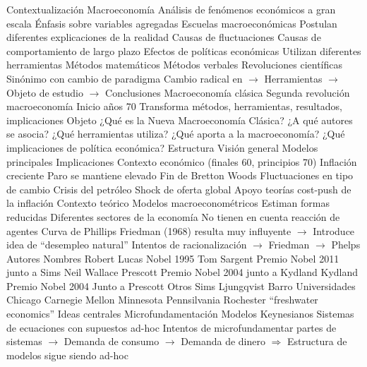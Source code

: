 \documentclass{nuevotema}
\begin{document}
\begin{esquemal}
	\1[] 
		\2 Contextualización
			\3 Macroeconomía
				\4 Análisis de fenómenos económicos a gran escala
				\4 Énfasis sobre variables agregadas
			\3 Escuelas macroeconómicas
				\4 Postulan diferentes explicaciones de la realidad
				\4[] Causas de fluctuaciones
				\4[] Causas de comportamiento de largo plazo
				\4[] Efectos de políticas económicas
				\4 Utilizan diferentes herramientas
				\4[] Métodos matemáticos
				\4[] Métodos verbales
				\4 Revoluciones científicas
				\4[] Sinónimo con cambio de paradigma
				\4[] Cambio radical en
				\4[] $\to$ Herramientas
				\4[] $\to$ Objeto de estudio
				\4[] $\to$ Conclusiones
			\3 Macroeconomía clásica
				\4 Segunda revolución macroeconomía
				\4 Inicio años 70
				\4 Transforma métodos, herramientas, resultados, implicaciones
		\2 Objeto
			\3 ¿Qué es la Nueva Macroeconomía Clásica?
			\3 ¿A qué autores se asocia?
			\3 ¿Qué herramientas utiliza?
			\3 ¿Qué aporta a la macroeconomía?
			\3 ¿Qué implicaciones de política económica?
		\2 Estructura
			\3 Visión general
			\3 Modelos principales
			\3 Implicaciones
	\1 
		\2 Contexto económico (finales 60, principios 70)
			\3 Inflación creciente
				\4 Paro se mantiene elevado
			\3 Fin de Bretton Woods
				\4 Fluctuaciones en tipo de cambio
			\3 Crisis del petróleo
				\4 Shock de oferta global
				\4 Apoyo teorías cost-push de la inflación
		\2 Contexto teórico
			\3 Modelos macroeconométricos
				\4 Estiman formas reducidas
				\4[] Diferentes sectores de la economía
				\4 No tienen en cuenta reacción de agentes
			\3 Curva de Phillips
				\4 Friedman (1968) resulta muy influyente
				\4[] $\to$ Introduce idea de ``desempleo natural''
				\4 Intentos de racionalización
				\4[] $\to$ Friedman
				\4[] $\to$ Phelps
		\2 Autores
			\3 Nombres
				\4 Robert Lucas
				\4[] Nobel 1995
				\4 Tom Sargent
				\4[] Premio Nobel 2011 junto a Sims
				\4 Neil Wallace
				\4 Prescott
				\4[] Premio Nobel 2004 junto a Kydland
				\4 Kydland
				\4[] Premio Nobel 2004 Junto a Prescott
				\4 Otros
				\4[] Sims
				\4[] Ljungqvist
				\4[] Barro
			\3 Universidades
				\4 Chicago
				\4 Carnegie Mellon
				\4 Minnesota
				\4 Pennsilvania
				\4 Rochester
				\4[$\to$] ``freshwater economics''
		\2 Ideas centrales
			\3 Microfundamentación
				\4 Modelos Keynesianos
				\4[] Sistemas de ecuaciones con supuestos ad-hoc
				\4[] Intentos de microfundamentar partes de sistemas
				\4[] $\to$ Demanda de consumo
				\4[] $\to$ Demanda de dinero
				\4[] $\Rightarrow$ Estructura de modelos sigue siendo ad-hoc

\end{esquemal}
\end{document}
